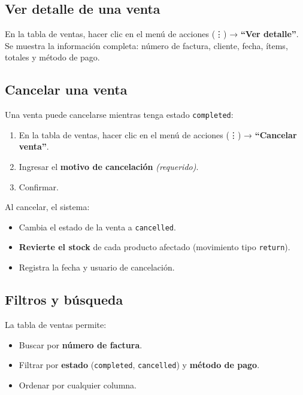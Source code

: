 \subsection{Ver detalle de una venta}\label{ver-detalle-de-una-venta}

En la tabla de ventas, hacer clic en el menú de acciones (⋮) → \textbf{``Ver detalle''}. Se muestra la información completa: número de factura, cliente, fecha, ítems, totales y método de pago.

\subsection{Cancelar una venta}\label{cancelar-una-venta}

Una venta puede cancelarse mientras tenga estado \texttt{completed}:

\begin{enumerate}
\def\labelenumi{\arabic{enumi}.}
\tightlist
\item
  En la tabla de ventas, hacer clic en el menú de acciones (⋮) → \textbf{``Cancelar venta''}.
\item
  Ingresar el \textbf{motivo de cancelación} \emph{(requerido)}.
\item
  Confirmar.
\end{enumerate}

Al cancelar, el sistema:

\begin{itemize}
\tightlist
\item
  Cambia el estado de la venta a \texttt{cancelled}.
\item
  \textbf{Revierte el stock} de cada producto afectado (movimiento tipo \texttt{return}).
\item
  Registra la fecha y usuario de cancelación.
\end{itemize}

\subsection{Filtros y búsqueda}\label{filtros-y-buxfasqueda}

La tabla de ventas permite:

\begin{itemize}
\tightlist
\item
  Buscar por \textbf{número de factura}.
\item
  Filtrar por \textbf{estado} (\texttt{completed}, \texttt{cancelled}) y \textbf{método de pago}.
\item
  Ordenar por cualquier columna.
\end{itemize}

